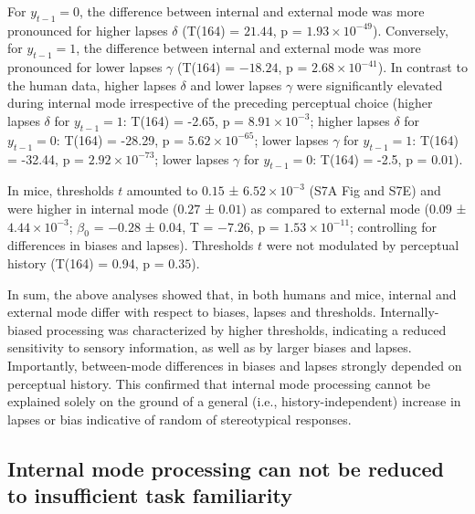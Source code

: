 \documentclass[
]{article}
\begin{document}
For \(y_{t-1} = 0\), the difference between internal and external mode
was more pronounced for higher lapses \(\delta\) (T(164) = \(21.44\), p
= \(\ensuremath{1.93\times 10^{-49}}\)). Conversely, for
\(y_{t-1} = 1\), the difference between internal and external mode was
more pronounced for lower lapses \(\gamma\) (T(\(164\)) = \(-18.24\), p
= \(\ensuremath{2.68\times 10^{-41}}\)). In contrast to the human data,
higher lapses \(\delta\) and lower lapses \(\gamma\) were significantly
elevated during internal mode irrespective of the preceding perceptual
choice (higher lapses \(\delta\) for \(y_{t-1} = 1\): T(164) = -2.65, p
= \(\ensuremath{8.91\times 10^{-3}}\); higher lapses \(\delta\) for
\(y_{t-1} = 0\): T(164) = -28.29, p =
\(\ensuremath{5.62\times 10^{-65}}\); lower lapses \(\gamma\) for
\(y_{t-1} = 1\): T(164) = -32.44, p =
\(\ensuremath{2.92\times 10^{-73}}\); lower lapses \(\gamma\) for
\(y_{t-1} = 0\): T(164) = -2.5, p = \(0.01\)).

In mice, thresholds \(t\) amounted to \(0.15\) ±
\(\ensuremath{6.52\times 10^{-3}}\) (S7A Fig and S7E) and
were higher in internal mode (\(0.27\) ± \(0.01\)) as compared to
external mode (\(0.09\) ± \(\ensuremath{4.44\times 10^{-3}}\);
\(\beta_0\) = \(-0.28\) ± \(0.04\), T = \(-7.26\), p =
\(\ensuremath{1.53\times 10^{-11}}\); controlling for differences in
biases and lapses). Thresholds \(t\) were not modulated by perceptual
history (T(164) = 0.94, p = \(0.35\)).

In sum, the above analyses showed that, in both humans and mice,
internal and external mode differ with respect to biases, lapses and
thresholds. Internally-biased processing was characterized by higher
thresholds, indicating a reduced sensitivity to sensory information, as
well as by larger biases and lapses. Importantly, between-mode
differences in biases and lapses strongly depended on perceptual
history. This confirmed that internal mode processing cannot be
explained solely on the ground of a general (i.e., history-independent)
increase in lapses or bias indicative of random of stereotypical
responses.

\hypertarget{internal-mode-processing-can-not-be-reduced-to-insufficient-task-familiarity}{%
\subsection{Internal mode processing can not be reduced to insufficient
task
familiarity}\label{internal-mode-processing-can-not-be-reduced-to-insufficient-task-familiarity}}
\end{document}
